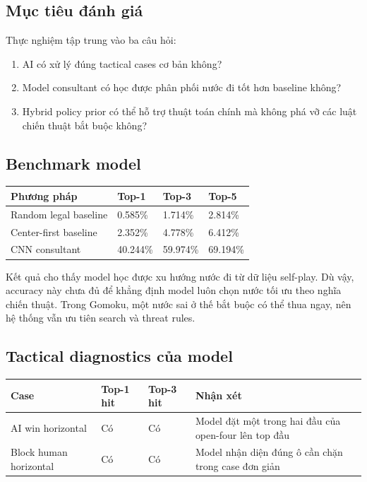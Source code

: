 \documentclass[12pt,a4paper]{article}
\begin{document}
\subsection{Mục tiêu đánh giá}

Thực nghiệm tập trung vào ba câu hỏi:

\begin{enumerate}[leftmargin=*]
  \item AI có xử lý đúng tactical cases cơ bản không?
  \item Model consultant có học được phân phối nước đi tốt hơn baseline không?
  \item Hybrid policy prior có thể hỗ trợ thuật toán chính mà không phá vỡ các luật chiến thuật bắt buộc không?
\end{enumerate}

\subsection{Benchmark model}

\begin{longtable}{p{}p{}p{}p{}}
\toprule
\textbf{Phương pháp} & \textbf{Top-1} & \textbf{Top-3} & \textbf{Top-5} \\
\midrule
Random legal baseline & 0.585\% & 1.714\% & 2.814\% \\
Center-first baseline & 2.352\% & 4.778\% & 6.412\% \\
CNN consultant & 40.244\% & 59.974\% & 69.194\% \\
\bottomrule
\end{longtable}

Kết quả cho thấy model học được xu hướng nước đi từ dữ liệu self-play. Dù vậy, accuracy này chưa đủ để khẳng định model luôn chọn nước tối ưu theo nghĩa chiến thuật. Trong Gomoku, một nước sai ở thế bắt buộc có thể thua ngay, nên hệ thống vẫn ưu tiên search và threat rules.

\subsection{Tactical diagnostics của model}

\begin{longtable}{p{}p{}p{}p{}}
\toprule
\textbf{Case} & \textbf{Top-1 hit} & \textbf{Top-3 hit} & \textbf{Nhận xét} \\
\midrule
AI win horizontal & Có & Có & Model đặt một trong hai đầu của open-four lên top đầu \\
Block human horizontal & Có & Có & Model nhận diện đúng ô cần chặn trong case đơn giản \\
\bottomrule
\end{longtable}
\end{document}
